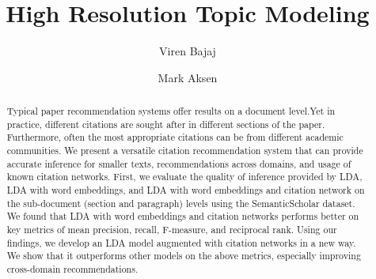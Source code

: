 \documentclass[sigconf]{acmart}
\begin{document}
\title{High Resolution Topic Modeling}

\author{Viren Bajaj}
\author{Mark Aksen}

\begin{abstract}
Typical paper recommendation systems offer results on a document level.Yet in practice, different citations are sought after in different sections of the paper. Furthermore, often the most appropriate citations can be from different academic communities. We present a versatile citation recommendation system that can provide accurate inference for smaller texts, recommendations across domains, and usage of known citation networks. First, we evaluate the quality of inference provided by LDA, LDA with word embeddings, and LDA with word embeddings and citation network on the sub-document (section and paragraph) levels using the SemanticScholar dataset. We found that LDA with word embeddings and citation networks performs better on key metrics of mean precision, recall, F-measure, and reciprocal rank. 
Using our findings, we develop an LDA model augmented with citation networks in a new way.
We show that it outperforms other models on the above metrics, especially improving cross-domain recommendations. 

\end{abstract}
\end{document}
